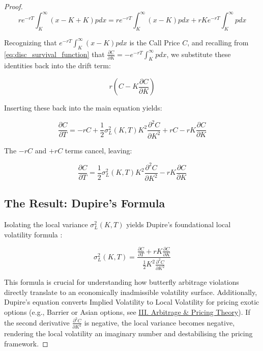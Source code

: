 \documentclass[12pt,oneside]{report}
\theoremstyle{definition}
\theoremstyle{remark}
\begin{document}
\begin{proof}
$$r e^{-rT} \int_{K}^{\infty} (x - K + K) p dx = r e^{-rT} \int_{K}^{\infty} (x - K) p dx + r K e^{-rT} \int_{K}^{\infty} p dx$$

Recognizing that $e^{-rT} \int_{K}^{\infty} (x - K) p dx$ is the Call Price $C$, and recalling from \ref{eq:disc_survival_function} that $\frac{\partial C}{\partial K} = -e^{-rT} \int_{K}^{\infty} p dx$, we substitute these identities back into the drift term:

$$r \left( C - K \frac{\partial C}{\partial K} \right)$$

Inserting these back into the main equation yields:

$$\frac{\partial C}{\partial T} = -rC + \frac{1}{2} \sigma_L^2(K, T) K^2 \frac{\partial^2 C}{\partial K^2} + rC - rK \frac{\partial C}{\partial K}$$

The $-rC$ and $+rC$ terms cancel, leaving:

$$\frac{\partial C}{\partial T} = \frac{1}{2} \sigma_L^2(K, T) K^2 \frac{\partial^2 C}{\partial K^2} - rK \frac{\partial C}{\partial K}$$

\subsection{The Result: Dupire’s Formula}

Isolating the local variance $\sigma_L^2(K, T)$ yields Dupire’s foundational local volatility formula \citep{dupire1994pricing}:

\begin{equation}
\sigma_L^2(K, T) = \frac{\frac{\partial C}{\partial T} + rK \frac{\partial C}{\partial K}}{\frac{1}{2} K^2 \frac{\partial^2 C}{\partial K^2}}
\label{eq:dupires_equation}
\end{equation}

This formula is crucial for understanding how butterfly arbitrage violations directly translate to an economically inadmissible volatility surface. Additionally, Dupire's equation \cite{dupire1994pricing} converts Implied Volatility to Local Volatility for pricing exotic options (e.g., Barrier or Asian options, see \hyperref[sec:glossary_arbitrage_pricing_theory]{III. Arbitrage \& Pricing Theory}). If the second derivative $\frac{\partial^2 C}{\partial K^2}$ is negative, the local variance becomes negative, rendering the local volatility an imaginary number and destabilising the pricing framework.
\end{proof}

\newpage
\end{document}
